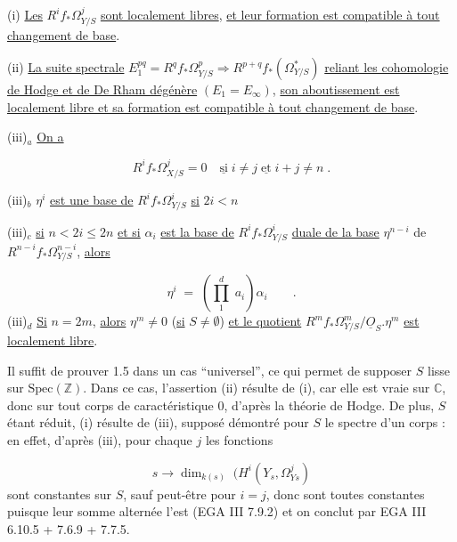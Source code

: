 (i) \underline{Les} $R^i f_* \Omega^j_{Y/S}$ \underline{sont localement libres}, \underline{et leur formation est compatible à tout changement de base}.

(ii) \underline{La suite spectrale} $E_1^{pq} = R^q f_* \Omega^p_{Y/S} \Longrightarrow R^{p+q} f_*(\Omega^*_{Y/S})$ \underline{reliant les cohomologie de Hodge et de De Rham dégénère} $(E_1 = E_\infty)$, \underline{son aboutissement est localement libre et sa formation est compatible à tout changement de base}.

(iii)$_a$ \underline{On a}

\begin{equation*}
R^i f_* \Omega^j_{X/S} = 0 \quad \underline{\mbox{si}} \; i \neq j \; \underline{\mbox{et}} \; i+j \neq n \; .
\end{equation*}


(iii)$_b$ $\eta^i$ \underline{est une base de} $R^i f_* \Omega^i_{Y/S}$ \underline{si} $2i < n$

(iii)$_c$ \underline{si} $n<2i\leq 2n$ \underline{et si} $\alpha_i$ \underline{est la base de} $R^i f_* \Omega^i_{Y/S}$ \underline{duale de la base} $\eta^{n-i}$ de $R^{n-i} f_* \Omega^{n-i}_{Y/S}$, \underline{alors}

\begin{equation*}
\eta^i \;=\; \left( \prod_1^d \; a_i \right) \alpha_i \qquad .
\end{equation*}
(iii)$_d$ \underline{Si} $n = 2m$, \underline{alors} $\eta^m \neq 0$ (\underline{si} $S \neq \emptyset$) \underline{et le quotient} $R^m f_* \Omega^m_{Y/S}/\underline{O}_S . \eta^m$ \underline{est localement libre}.

Il suffit de prouver 1.5 dans un cas ``universel'', ce qui permet de supposer $S$ lisse sur $\mathrm{Spec}(\mathbb{Z})$. Dans ce cas, l'assertion (ii) résulte de (i), car elle est vraie sur $\mathbb{C}$, donc sur tout corps de caractéristique $0$, d'après la théorie de Hodge. De plus, $S$ étant réduit, (i) résulte de (iii), supposé démontré pour $S$ le spectre d'un corps : en effet, d'après (iii), pour chaque $j$ les fonctions

\begin{equation*}
s \longrightarrow \dim_{k(s)} \; (H^i(Y_s,\Omega^j_{Ys})
\end{equation*}
sont constantes sur $S$, sauf peut-être pour $i = j$, donc sont toutes constantes puisque leur somme alternée l'est (EGA III 7.9.2) et on conclut par EGA III 6.10.5 + 7.6.9 + 7.7.5.


